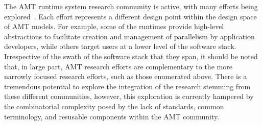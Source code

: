 \begin{figure}
\centering
\caption{}
\label{fig:basicHPCStack}
\end{figure}

The \gls{AMT} \gls{runtime system} research community is active, with many efforts being
explored~\cite{OCR,STAPL,Legion,StencilHPX,Charm++,Uintah, Loci}.
Each effort represents a different design point within the design space of AMT
models. For example, some of the runtimes provide high-level abstractions to
facilitate creation and management of parallelism by application developers,
while others target users at a lower level of the software stack.  
Irrespective of the swath of the software stack that they span, it should be
noted that, in large part, \gls{AMT} research efforts are complementary to the 
more narrowly focused research efforts, such as those enumerated above.
There is a tremendous potential to explore the integration of
the research stemming from these different communities,
 however,  this exploration is currently hampered by the combinatorial
 complexity posed by the lack of standards, common terminology, and 
resusable components within the \gls{AMT} community.


